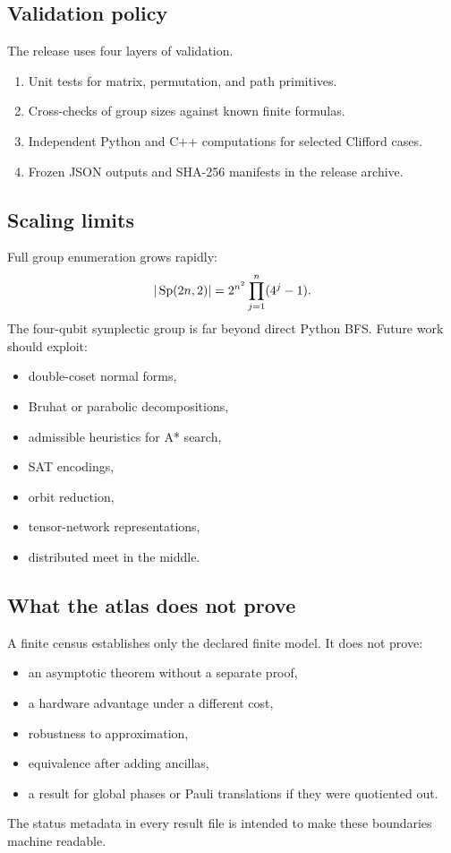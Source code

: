 \subsection{Validation policy}
The release uses four layers of validation.
\begin{enumerate}
\item Unit tests for matrix, permutation, and path primitives.
\item Cross-checks of group sizes against known finite formulas.
\item Independent Python and C++ computations for selected Clifford cases.
\item Frozen JSON outputs and SHA-256 manifests in the release archive.
\end{enumerate}

\subsection{Scaling limits}
Full group enumeration grows rapidly:
\[
|\operatorname{Sp}(2n,2)|
=2^{n^2}\prod_{j=1}^n(4^j-1).
\]
The four-qubit symplectic group is far beyond direct Python BFS.  Future work should exploit:
\begin{itemize}
\item double-coset normal forms,
\item Bruhat or parabolic decompositions,
\item admissible heuristics for A* search,
\item SAT encodings,
\item orbit reduction,
\item tensor-network representations,
\item distributed meet in the middle.
\end{itemize}

\subsection{What the atlas does not prove}
A finite census establishes only the declared finite model.  It does not prove:
\begin{itemize}
\item an asymptotic theorem without a separate proof,
\item a hardware advantage under a different cost,
\item robustness to approximation,
\item equivalence after adding ancillas,
\item a result for global phases or Pauli translations if they were quotiented out.
\end{itemize}
The status metadata in every result file is intended to make these boundaries machine readable.

